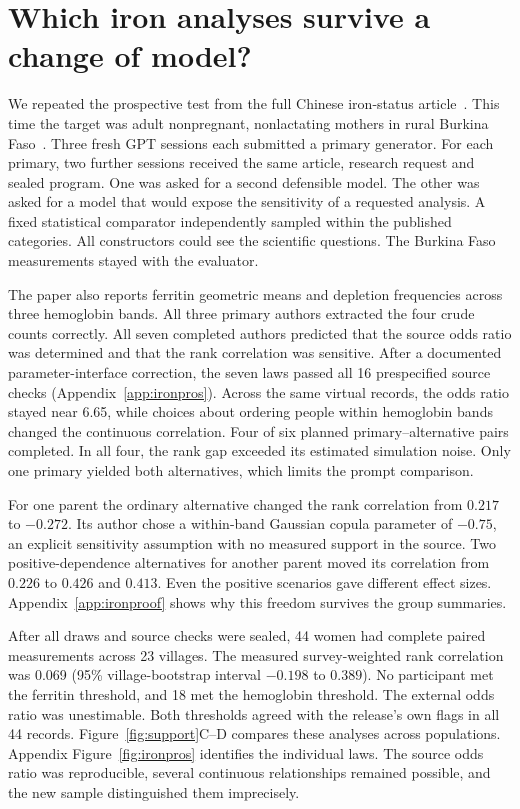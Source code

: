\documentclass[sigconf,anonymous,review]{acmart}
\begin{document}
\section{Which iron analyses survive a change of model?}
\label{sec:ironpros}
We repeated the prospective test from the full Chinese iron-status article~\cite{zhu}. This time the target was adult nonpregnant, nonlactating mothers in rural Burkina Faso~\cite{burkina_iron}. Three fresh GPT sessions each submitted a primary generator. For each primary, two further sessions received the same article, research request and sealed program. One was asked for a second defensible model. The other was asked for a model that would expose the sensitivity of a requested analysis. A fixed statistical comparator independently sampled within the published categories. All constructors could see the scientific questions. The Burkina Faso measurements stayed with the evaluator.

The paper also reports ferritin geometric means and depletion frequencies across three hemoglobin bands. All three primary authors extracted the four crude counts correctly. All seven completed authors predicted that the source odds ratio was determined and that the rank correlation was sensitive. After a documented parameter-interface correction, the seven laws passed all 16 prespecified source checks (Appendix~\ref{app:ironpros}). Across the same virtual records, the odds ratio stayed near 6.65, while choices about ordering people within hemoglobin bands changed the continuous correlation. Four of six planned primary--alternative pairs completed. In all four, the rank gap exceeded its estimated simulation noise. Only one primary yielded both alternatives, which limits the prompt comparison.


For one parent the ordinary alternative changed the rank correlation from $0.217$ to $-0.272$. Its author chose a within-band Gaussian copula parameter of $-0.75$, an explicit sensitivity assumption with no measured support in the source. Two positive-dependence alternatives for another parent moved its correlation from $0.226$ to $0.426$ and $0.413$. Even the positive scenarios gave different effect sizes. Appendix~\ref{app:ironproof} shows why this freedom survives the group summaries.

After all draws and source checks were sealed, 44 women had complete paired measurements across 23 villages. The measured survey-weighted rank correlation was 0.069 (95\% village-bootstrap interval $-0.198$ to $0.389$). No participant met the ferritin threshold, and 18 met the hemoglobin threshold. The external odds ratio was unestimable. Both thresholds agreed with the release's own flags in all 44 records. Figure~\ref{fig:support}C--D compares these analyses across populations. Appendix Figure~\ref{fig:ironpros} identifies the individual laws. The source odds ratio was reproducible, several continuous relationships remained possible, and the new sample distinguished them imprecisely.
\end{document}
